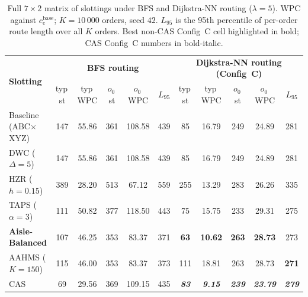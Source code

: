 \documentclass[12pt,a4paper]{article}
\begin{document}
\begin{table}[H]
\centering
\caption{Full $7 \times 2$ matrix of slottings under BFS and Dijkstra-NN routing
  ($\lambda = 5$). WPC against $c_e^{\text{base}}$; $K = 10\,000$ orders, seed $42$.
  $L_{95}$ is the 95th percentile of per-order route length over all $K$ orders.
  Best non-CAS Config~C cell highlighted in bold; CAS Config~C numbers in
  bold-italic.}
\label{tab:config_c_matrix}
\renewcommand{\arraystretch}{1.15}
\setlength{\tabcolsep}{3pt}
\begin{tabular}{l|ccccc|ccccc}
\hline
\multirow{2}{*}{\textbf{Slotting}} &
  \multicolumn{5}{c|}{\textbf{BFS routing}} &
  \multicolumn{5}{c}{\textbf{Dijkstra-NN routing (Config~C)}} \\
 & typ\,st & typ\,WPC & $o_0$\,st & $o_0$\,WPC & $L_{95}$
 & typ\,st & typ\,WPC & $o_0$\,st & $o_0$\,WPC & $L_{95}$ \\
\hline
Baseline (ABC$\times$XYZ) & 147 & 55.86 & 361 & 108.58 & 439 &  85 & 16.79 & 249 & 24.89 & 281 \\
DWC ($\Delta = 5$)         & 147 & 55.86 & 361 & 108.58 & 439 &  85 & 16.79 & 249 & 24.89 & 281 \\
HZR ($h = 0.15$)           & 389 & 28.20 & 513 &  67.12 & 559 & 255 & 13.29 & 283 & 26.26 & 335 \\
TAPS ($\alpha = 3$)        & 111 & 50.82 & 377 & 118.50 & 443 &  75 & 15.75 & 233 & 29.31 & 275 \\
\textbf{Aisle-Balanced}    & 107 & 46.25 & 353 &  83.37 & 371
                           & \textbf{63} & \textbf{10.62} & \textbf{263} & \textbf{28.73} & 273 \\
AAHMS ($K = 150$)          & 115 & 46.00 & 353 &  83.37 & 373 & 111 & 18.81 & 263 & 28.73 & \textbf{271} \\
CAS                        &  69 & 29.56 & 369 & 109.15 & 435
                           & \textit{\textbf{83}} & \textit{\textbf{9.15}}
                           & \textit{\textbf{239}} & \textit{\textbf{23.79}}
                           & \textit{\textbf{279}} \\
\hline
\end{tabular}
\end{table}
\end{document}
